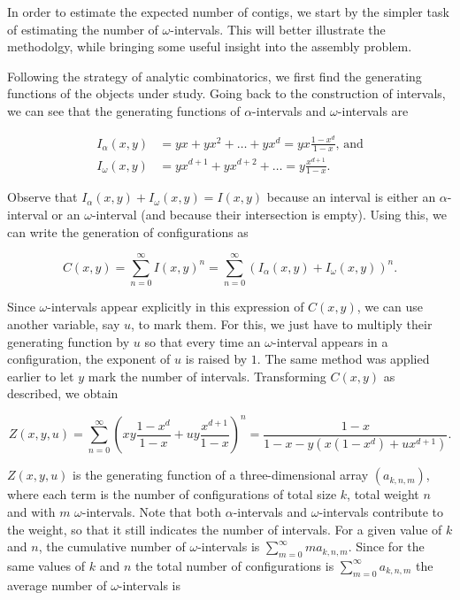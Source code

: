 \documentclass{article}
\begin{document}
In order to estimate the expected number of contigs, we start by the
simpler task of estimating the number of $\omega$-intervals. This will
better illustrate the methodolgy, while bringing some useful insight into
the assembly problem.

Following the strategy of analytic combinatorics, we first find the
generating functions of the objects under study. Going back to the
construction of intervals, we can see that the generating functions of
$\alpha$-intervals and $\omega$-intervals are

\begin{equation*}
\begin{split}
I_\alpha(x,y) &= yx + yx^2 + \ldots + yx^d
= yx\frac{1-x^d}{1-x}\text{, and} \\
I_\omega(x,y) &= yx^{d+1} + yx^{d+2} + \ldots = y\frac{x^{d+1}}{1-x}.
\end{split}
\end{equation*}

Observe that $I_\alpha(x,y)+I_\omega(x,y) = I(x,y)$ because an interval is
either an $\alpha$-interval or an $\omega$-interval (and because their
intersection is empty). Using this, we can write the generation of
configurations as

\begin{equation}
\label{eq:C2ndform}
C(x,y) = \sum_{n=0}^\infty I(x,y)^n
= \sum_{n=0}^\infty \left( I_\alpha(x,y) + I_\omega(x,y) \right)^n.
\end{equation}

Since $\omega$-intervals appear explicitly in this expression of $C(x,y)$,
we can use another variable, say $u$, to mark them. For this, we just have
to multiply their generating function by $u$ so that every time an
$\omega$-interval appears in a configuration, the exponent of $u$ is
raised by $1$. The same method was applied earlier to let $y$ mark the
number of intervals. Transforming $C(x,y)$ as described, we obtain

\begin{equation*}
Z(x,y,u) = \sum_{n=0}^\infty \left(xy\frac{1-x^d}{1-x} +
uy\frac{x^{d+1}}{1-x}\right)^n
= \frac{1-x}{1-x-y\left(x(1-x^d) +ux^{d+1}\right)}.
\end{equation*}

$Z(x,y,u)$ is the generating function of a three-dimensional array
$(a_{k,n,m})$, where each term is the number of configurations of total
size $k$, total weight $n$ and with $m$ $\omega$-intervals. Note that both
$\alpha$-intervals and $\omega$-intervals contribute to the weight, so
that it still indicates the number of intervals. For a given value of $k$
and $n$, the cumulative number of $\omega$-intervals is $\sum_{m=0}^\infty
ma_{k,n,m}$. Since for the same values of $k$ and $n$ the total number of
configurations is $\sum_{m=0}^\infty a_{k,n,m}$ the average number of
$\omega$-intervals is
\end{document}
